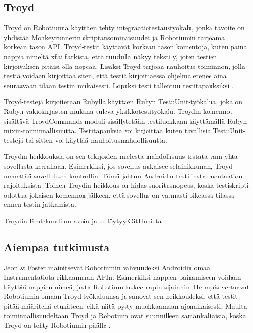 \subsection{Troyd}

Troyd on Robotiumia käyttäen tehty integraatiotestaustyökalu, jonka tavoite on yhdistää Monkeyrunnerin skriptausominaisuudet ja Robotiumin tarjoama korkean tason API. Troyd-testit käyttävät korkean tason komentoja, kuten \"paina nappia nimeltä x\" tai \"tarkista, että ruudulla näkyy teksti y\", joten testien kirjoituksen pitäisi olla nopeaa. Lisäksi Troyd tarjoaa nauhoitus-toiminnon, jolla testiä voidaan kirjoittaa siten, että testiä kirjoittaessa ohjelma etenee aina seuraavaan tilaan testin mukaisesti. Lopuksi testi tallentuu testitapauksiksi \cite{troyd}.

Troyd-testejä kirjoitetaan Rubylla käyttäen Rubyn Test::Unit-työkalua, joka on Rubyn vakiokirjaston mukana tuleva yksikkötestityökalu. \cite{testunit} Troydin komennot sisältävä TroydCommands-moduli sisällytetään testiluokkaan käyttämällä Rubyn mixin-toiminnallisuutta. Testitapauksia voi kirjoittaa kuten tavallisia Test::Unit-testejä tai sitten voi käyttää nauhoitusmahdollisuutta.

Troydin heikkouksia on sen tekijöiden mielestä mahdollisuus testata vain yhtä sovellusta kerrallaan. Esimerkiksi, jos sovellus aukaisee selainikkunan, Troyd menettää sovelluksen kontrollin. Tämä johtuu Androidin testi-instrumentaation rajoituksista. Toinen Troydin heikkous on hidas suoritusnopeus, koska testiskripti odottaa jokaisen komennon jälkeen, että sovellus on varmasti oikeassa tilassa ennen testin jatkamista. \cite{troyd}

Troydin lähdekoodi on avoin ja se löytyy GitHubista \cite{troyd_github}.

\subsection{Aiempaa tutkimusta}

Jeon \& Foster mainitsevat Robotiumin vahvuudeksi Androidin omaa Instrumentatiota rikkaamman APIn. Esimerkiksi nappien painamiseen voidaan käyttää nappien nimeä, josta Robotium laskee napin sijainnin. He myös vertaavat Robotiumia omaan Troyd-työkaluunsa ja sanovat sen heikkoudeksi, että testit pitää määritellä etukäteen, eikä niitä pysty muokkaamaan ajonaikaisesti. Muulta toiminnallisuudeltaan Troyd ja Robotium ovat suunnilleen samankaltaisia, koska Troyd on tehty Robotiumin päälle \cite{troyd}.

